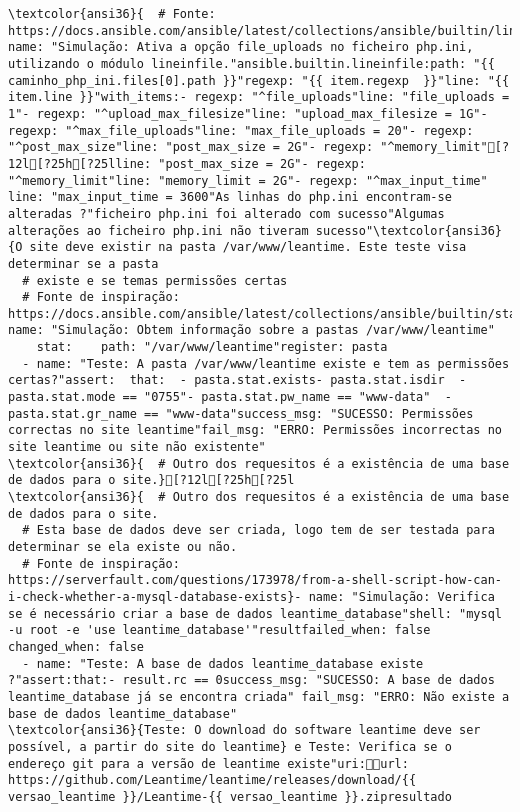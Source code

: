 \documentclass{scrartcl}
\begin{document}
\begin{Verbatim}
\textcolor{ansi36}{  # Fonte: https://docs.ansible.com/ansible/latest/collections/ansible/builtin/lineinfile_module.html}- name: "Simulação: Ativa a opção file_uploads no ficheiro php.ini, utilizando o módulo lineinfile."ansible.builtin.lineinfile:path: "{{ caminho_php_ini.files[0].path }}"regexp: "{{ item.regexp  }}"line: "{{ item.line }}"with_items:- regexp: "^file_uploads"line: "file_uploads = 1"- regexp: "^upload_max_filesize"line: "upload_max_filesize = 1G"- regexp: "^max_file_uploads"line: "max_file_uploads = 20"- regexp: "^post_max_size"line: "post_max_size = 2G"- regexp: "^memory_limit"[?12l[?25h[?25lline: "post_max_size = 2G"- regexp: "^memory_limit"line: "memory_limit = 2G"- regexp: "^max_input_time"  line: "max_input_time = 3600"As linhas do php.ini encontram-se alteradas ?"ficheiro php.ini foi alterado com sucesso"Algumas alterações ao ficheiro php.ini não tiveram sucesso"\textcolor{ansi36}{O site deve existir na pasta /var/www/leantime. Este teste visa determinar se a pasta
  # existe e se temas permissões certas
  # Fonte de inspiração: https://docs.ansible.com/ansible/latest/collections/ansible/builtin/stat_module.html}- name: "Simulação: Obtem informação sobre a pastas /var/www/leantime"
    stat:    path: "/var/www/leantime"register: pasta
  - name: "Teste: A pasta /var/www/leantime existe e tem as permissões certas?"assert:  that:  - pasta.stat.exists- pasta.stat.isdir  - pasta.stat.mode == "0755"- pasta.stat.pw_name == "www-data"  - pasta.stat.gr_name == "www-data"success_msg: "SUCESSO: Permissões correctas no site leantime"fail_msg: "ERRO: Permissões incorrectas no site leantime ou site não existente"
\textcolor{ansi36}{  # Outro dos requesitos é a existência de uma base de dados para o site.}[?12l[?25h[?25l
\textcolor{ansi36}{  # Outro dos requesitos é a existência de uma base de dados para o site.
  # Esta base de dados deve ser criada, logo tem de ser testada para determinar se ela existe ou não.
  # Fonte de inspiração: https://serverfault.com/questions/173978/from-a-shell-script-how-can-i-check-whether-a-mysql-database-exists}- name: "Simulação: Verifica se é necessário criar a base de dados leantime_database"shell: "mysql -u root -e 'use leantime_database'"resultfailed_when: false  changed_when: false
  - name: "Teste: A base de dados leantime_database existe ?"assert:that:- result.rc == 0success_msg: "SUCESSO: A base de dados leantime_database já se encontra criada" fail_msg: "ERRO: Não existe a base de dados leantime_database"
\textcolor{ansi36}{Teste: O download do software leantime deve ser possível, a partir do site do leantime} e Teste: Verifica se o endereço git para a versão de leantime existe"uri:url: https://github.com/Leantime/leantime/releases/download/{{ versao_leantime }}/Leantime-{{ versao_leantime }}.zipresultado

\end{Verbatim}
\end{document}
